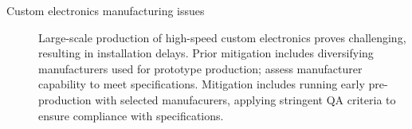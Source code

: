 \begin{description}
\item[Custom electronics manufacturing issues] Large-scale production of high-speed custom
  electronics proves challenging, resulting in  installation delays. Prior mitigation includes diversifying manufacturers used for prototype production; assess manufacturer capability to meet specifications.  Mitigation includes running early pre-production with selected manufacurers, applying stringent QA criteria to ensure compliance with specifications.

\end{description}
